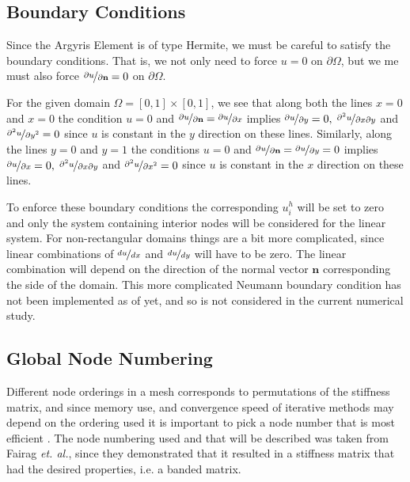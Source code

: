 \subsection{Boundary Conditions}
Since the Argyris Element is of type Hermite, we must be careful to satisfy the
boundary conditions. That is, we not only need to force $u=0$ on $\partial
\Omega$, but we me must also force $\nicefrac{\partial u}{\partial
\mathbf{n}} = 0$ on $\partial \Omega$. 

For the given domain $\Omega=[0,1]\times[0,1]$, we see that along both the lines
$x=0$ and $x=0$ the condition $u=0$ and $\nicefrac{\partial u}{\partial
\mathbf{n}} = \nicefrac{\partial u}{\partial x}$ implies $\nicefrac{\partial
u}{\partial y} = 0,\; \nicefrac{\partial^2 u}{\partial x \partial y}$ and 
$\nicefrac{\partial^2 u}{\partial y^2}=0$ since $u$ is constant in the $y$
direction on these lines.  Similarly, along the lines $y=0$ and
$y=1$ the conditions $u=0$ and $\nicefrac{\partial u}{\partial \mathbf{n}} =
\nicefrac{\partial u}{\partial y} = 0$ implies $\nicefrac{\partial
u}{\partial x} = 0,\; \nicefrac{\partial^2 u}{\partial x \partial y}$ and
$\nicefrac{\partial^2 u}{\partial x^2}=0$ since $u$ is constant in the $x$
direction on these lines.

To enforce these boundary conditions the corresponding $u^h_i$ will be set to
zero and only the system containing interior nodes will be considered for the
linear system. For non-rectangular domains things are a bit more complicated,
since linear combinations of $\nicefrac{du}{dx}$ and $\nicefrac{du}{dy}$ will
have to be zero. The linear combination will depend on the direction of the
normal vector $\mathbf{n}$ corresponding the side of the domain. This more
complicated Neumann boundary condition has not been implemented as of yet, and
so is not considered in the current numerical study.

\subsection{Global Node Numbering}
Different node orderings in a mesh corresponds to permutations of the stiffness
matrix, and since memory use, and convergence speed of iterative methods may
depend on the ordering used it is important to pick a node number that is most
efficient \cite{Fairag}. The node numbering used and that will be
described was taken from Fairag \emph{et. al.}, since they demonstrated that it
resulted in a stiffness matrix that had the desired properties, i.e. a banded
matrix.

